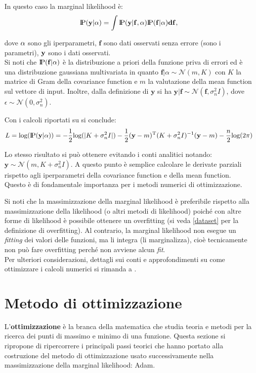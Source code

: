 In questo caso la marginal likelihood è:
\[
\text{I\kern-0.18em P}(\bf{y}|\bf{\alpha}) = \int \text{I\kern-0.18em P}(\bf{y}| \mathbf{f},\bf{\alpha})\text{I\kern-0.18em P}(\mathbf{f}|\bf{\alpha}) d\mathbf{f},
\]

dove $\bf{\alpha}$ sono gli iperparametri, $\mathbf{f}$ sono dati osservati senza errore (sono i parametri), $\bf{y}$ sono i dati osservati.\\
Si noti che $\text{I\kern-0.18em P}(\mathbf{f}|\bf{\alpha})$ è la distribuzione a priori della funzione priva di errori ed è una distribuzione gaussiana multivariata in quanto $\mathbf{f}|\alpha\sim \mathcal{N}(m, K)$ con $K$ la matrice di Gram della covariance function e $m$ la valutazione della mean function sul vettore di input. Inoltre, dalla definizione di $\mathbf{y}$ si ha $\mathbf{y}|\mathbf{f}\sim \mathcal{N}(\mathbf{f}, \sigma_n^2I)$, dove $\epsilon\sim \mathcal{N}(0,\sigma_n^2)$.

\newpage

Con i calcoli riportati su \cite{rasmussen_gaussian_2006} si conclude:
\[
L=\text{log}(\text{I\kern-0.18em P}(\mathbf{y}|\alpha))=-\frac{1}{2}\text{log}(|K+\sigma_n^2I|)-\frac{1}{2}(\mathbf{y}-m)^{\text{T}}(K+\sigma_n^2I)^{-1}(\mathbf{y}-m)-\frac{n}{2}\text{log}(2\pi)
\]

Lo stesso risultato si può ottenere evitando i conti analitici notando: $\mathbf{y}\sim \mathcal{N}(m, K+\sigma_n^2I)$. A questo punto è semplice calcolare le derivate parziali rispetto agli iperparametri della covariance function e della mean function. Questo è di fondamentale importanza per i metodi numerici di ottimizzazione.

Si noti che la massimizzazione della marginal likelihood è preferibile rispetto alla massimizzazione della likelihood (o altri metodi di likelihood) poiché con altre forme di likelihood è possibile ottenere un overfitting (si veda \ref{dataset} per la definizione di overfitting). Al contrario, la marginal likelihood non esegue un \textit{fitting} dei valori delle funzioni, ma li integra (li marginalizza), cioè tecnicamente non può fare overfitting perché non avviene alcun \textit{fit}. \\

Per ulteriori considerazioni, dettagli sui conti e approfondimenti su come ottimizzare i calcoli numerici si rimanda a \cite{rasmussen_gaussian_2006}.




\section{Metodo di ottimizzazione}
L'\textbf{ottimizzazione} è la branca della matematica che studia teoria e metodi per la ricerca dei punti di massimo e minimo di una funzione. Questa sezione si ripropone di ripercorrere i principali passi teorici che hanno portato alla costruzione del metodo di ottimizzazione usato successivamente nella massimizzazione della marginal likelihood: Adam.

